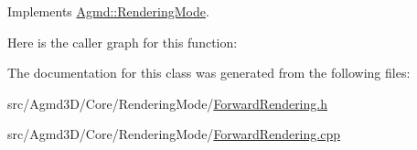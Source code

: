 Implements \hyperlink{class_agmd_1_1_rendering_mode_a725fdff706bd725df5b4ab3caadbaf02}{Agmd\+::\+Rendering\+Mode}.



Here is the caller graph for this function\+:




The documentation for this class was generated from the following files\+:\begin{DoxyCompactItemize}
\item 
src/\+Agmd3\+D/\+Core/\+Rendering\+Mode/\hyperlink{_forward_rendering_8h}{Forward\+Rendering.\+h}\item 
src/\+Agmd3\+D/\+Core/\+Rendering\+Mode/\hyperlink{_forward_rendering_8cpp}{Forward\+Rendering.\+cpp}\end{DoxyCompactItemize}
